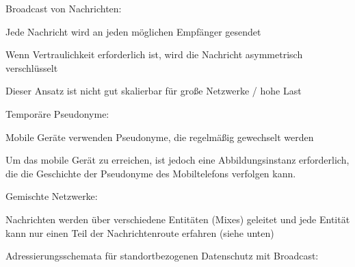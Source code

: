 \documentclass[a4paper]{article}
\begin{document}
\begin{multicols}{3}
\begin{itemize*}
\begin{itemize*}
                  \begin{itemize*}
                        \item Broadcast von Nachrichten:
                        \begin{itemize*} \item Jede Nachricht wird an jeden möglichen Empfänger gesendet \item Wenn Vertraulichkeit erforderlich ist, wird die Nachricht asymmetrisch verschlüsselt \item Dieser Ansatz ist nicht gut skalierbar für große Netzwerke / hohe Last \end{itemize*}
                        \item Temporäre Pseudonyme:
                        \begin{itemize*} \item Mobile Geräte verwenden Pseudonyme, die regelmäßig gewechselt werden \item Um das mobile Gerät zu erreichen, ist jedoch eine Abbildungsinstanz erforderlich, die die Geschichte der Pseudonyme des Mobiltelefons verfolgen kann. \end{itemize*}
                        \item Gemischte Netzwerke:
                        \begin{itemize*} \item Nachrichten werden über verschiedene Entitäten (Mixes) geleitet und jede Entität kann nur einen Teil der Nachrichtenroute erfahren (siehe unten) \end{itemize*}
                  \end{itemize*}
                  \item
                  Adressierungsschemata für standortbezogenen Datenschutz mit Broadcast:


\end{itemize*}
\end{itemize*}
\end{multicols}
\end{document}

